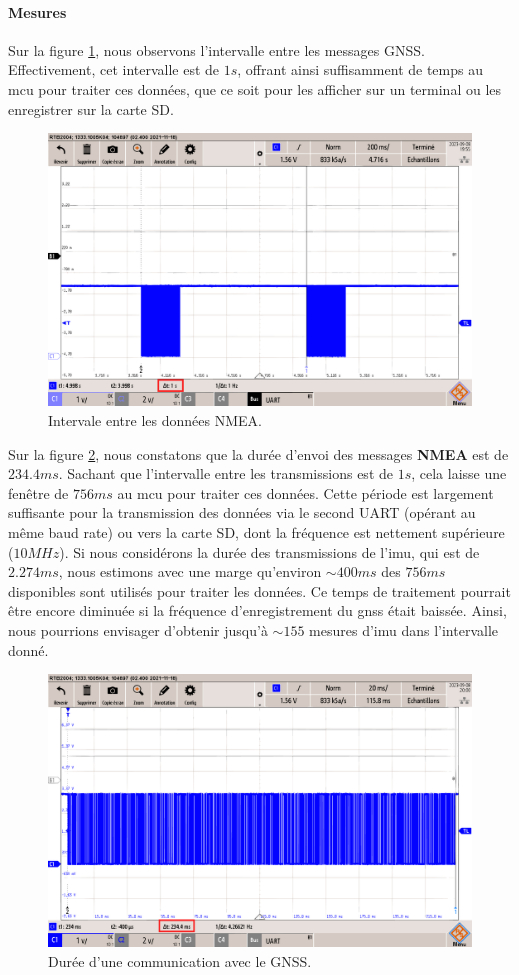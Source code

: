 \paragraph{Mesures}
Sur la figure \ref{fig:interval-gnss}, nous observons l'intervalle entre les messages GNSS. Effectivement, cet intervalle est de \underline{$1s$}, offrant ainsi suffisamment de temps au \gls{mcu} pour traiter ces données, que ce soit pour les afficher sur un terminal ou les enregistrer sur la carte SD.

\begin{figure}[H]
	\centering
	\includegraphics[width=0.7\linewidth]{../figures/mesures/UART/interval-gnss}
	\caption{Intervale entre les données NMEA.}
	\label{fig:interval-gnss}
\end{figure}

Sur la figure \ref{fig:duree-comm-gnss}, nous constatons que la durée d'envoi des messages \textbf{NMEA} est de \underline{$234.4 ms$}. Sachant que l'intervalle entre les transmissions est de \underline{$1s$}, cela laisse une fenêtre de $756ms$ au \gls{mcu} pour traiter ces données. Cette période est largement suffisante pour la transmission des données via le second UART (opérant au même baud rate) ou vers la carte SD, dont la fréquence est nettement supérieure ($10MHz$). Si nous considérons la durée des transmissions de l'\gls{imu}, qui est de \underline{$2.274ms$}, nous estimons avec une marge qu'environ $\sim400ms$ des $756ms$ disponibles sont utilisés pour traiter les données. Ce temps de traitement pourrait être encore diminuée si la fréquence d'enregistrement du \gls{gnss} était baissée. Ainsi, nous pourrions envisager d'obtenir jusqu'à $\sim155$ mesures d'\gls{imu} dans l'intervalle donné.


\begin{figure}[H]
	\centering
	\includegraphics[width=0.7\linewidth]{../figures/mesures/UART/duree-comm-gnss}
	\caption{Durée d'une communication avec le GNSS.}
	\label{fig:duree-comm-gnss}
\end{figure}

